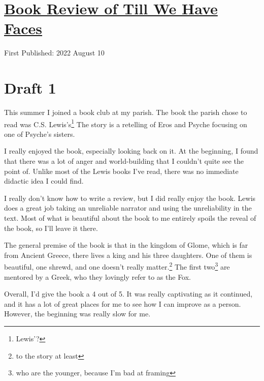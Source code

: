 \documentclass[12pt]{article}[titlepage]
\newcommand{\1}{\={a}}
\newcommand{\2}{\={e}}
\newcommand{\3}{\={\i}}
\newcommand{\4}{\=o}
\newcommand{\5}{\=u}
\newcommand{\6}{\={A}}
\renewcommand{\,}{\textsuperscript{,}}
\begin{document}
\doublespacing
\section{\href{book-review-faces-lewis.html}{Book Review of Till We Have Faces}}
First Published: 2022 August 10
\section{Draft 1}
This summer I joined a book club at my parish.
The book the parish chose to read was C.S. Lewis's\footnote{Lewis'?} 
The story is a retelling of Eros and Psyche focusing on one of Psyche's sisters.

I really enjoyed the book, especially looking back on it.
At the beginning, I found that there was a lot of anger and world-building that I couldn't quite see the point of.
Unlike most of the Lewis books I've read, there was no immediate didactic idea I could find.

I really don't know how to write a review, but I did really enjoy the book.
Lewis does a great job taking an unreliable narrator and using the unreliability in the text.
Most of what is beautiful about the book to me entirely spoils the reveal of the book, so I'll leave it there.

The general premise of the book is that in the kingdom of Glome, which is far from Ancient Greece, there lives a king and his three daughters.
One of them is beautiful, one shrewd, and one doesn't really matter.\footnote{to the story at least}
The first two\footnote{who are the younger, because I'm bad at framing} are mentored by a Greek, who they lovingly refer to as the Fox.

Overall, I'd give the book a 4 out of 5.
It was really captivating as it continued, and it has a lot of great places for me to see how I can improve as a person.
However, the beginning was really slow for me.
\end{document}
